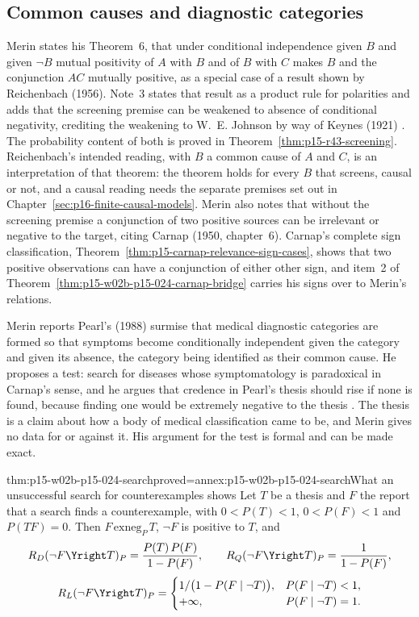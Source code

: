 \subsection{Common causes and diagnostic categories}
\label{sec:p15-w02b-p15-024-common-cause}

Merin states his Theorem~6, that under conditional independence given
\(B\) and given \(\neg B\) mutual positivity of \(A\) with \(B\) and of
\(B\) with \(C\) makes \(B\) and the conjunction \(AC\) mutually
positive, as a special case of a result shown by Reichenbach (1956).
Note~3 states that result as a product rule for polarities and adds
that the screening premise can be weakened to absence of conditional
negativity, crediting the weakening to W.~E. Johnson by way of Keynes
(1921) \cite[p.~267 and p.~274, n.~3]{Merin2021Relevance}. The
probability content of both is proved in
Theorem~\ref{thm:p15-r43-screening}. Reichenbach's intended reading,
with \(B\) a common cause of \(A\) and \(C\), is an interpretation of
that theorem: the theorem holds for every \(B\) that screens, causal or
not, and a causal reading needs the separate premises set out in
Chapter~\ref{sec:p16-finite-causal-models}. Merin also notes that
without the screening premise a conjunction of two positive sources can
be irrelevant or negative to the target, citing Carnap (1950,
chapter~6). Carnap's complete sign classification,
Theorem~\ref{thm:p15-carnap-relevance-sign-cases}, shows that two
positive observations can have a conjunction of either other sign, and
item~2 of Theorem~\ref{thm:p15-w02b-p15-024-carnap-bridge} carries his
signs over to Merin's relations.

Merin reports Pearl's (1988) surmise that medical diagnostic categories
are formed so that symptoms become conditionally independent given the
category and given its absence, the category being identified as their
common cause. He proposes a test: search for diseases whose
symptomatology is paradoxical in Carnap's sense, and he argues that
credence in Pearl's thesis should rise if none is found, because
finding one would be extremely negative to the thesis
\cite[p.~267]{Merin2021Relevance}. The thesis is a claim about how a
body of medical classification came to be, and Merin gives no data for
or against it. His argument for the test is formal and can be made
exact.

\begin{hbtheorem}{thm:p15-w02b-p15-024-search}{proved=annex:p15-w02b-p15-024-search}{What an unsuccessful search for counterexamples shows}
Let \(T\) be a thesis and \(F\) the report that a search finds a
counterexample, with \(0<P(T)<1\), \(0<P(F)<1\) and \(P(TF)=0\). Then
\(F\,\mathrm{exneg}_P\,T\), \(\neg F\) is positive to \(T\), and
\[
 R_D(\neg F\Yright T)_P=\frac{P(T)\,P(F)}{1-P(F)},\qquad
 R_Q(\neg F\Yright T)_P=\frac{1}{1-P(F)},
\]
\[
 R_L(\neg F\Yright T)_P=
 \begin{cases}
 1/\bigl(1-P(F\mid\neg T)\bigr),&P(F\mid\neg T)<1,\\
 +\infty,&P(F\mid\neg T)=1.
 \end{cases}
\]
\end{hbtheorem}

